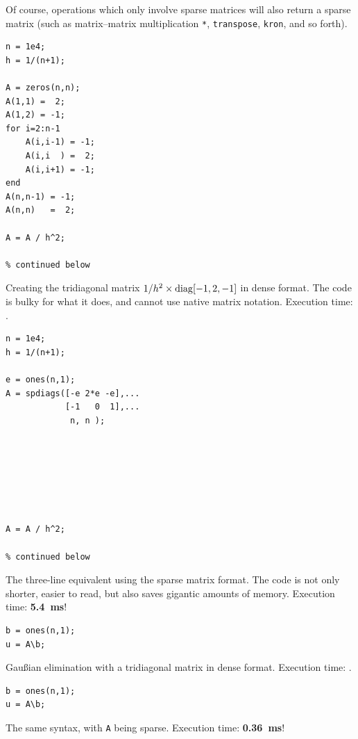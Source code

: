 
Of course, operations which only involve sparse matrices will also return a
sparse matrix (such as matrix--matrix multiplication \lstinline!*!,
\lstinline!transpose!, \lstinline!kron!, and so forth).



\hfill
\begin{minipage}[t]{.45\textwidth}
\begin{lstlisting}[framerule=2pt,rulecolor=\color{badred}]
n = 1e4;
h = 1/(n+1);

A = zeros(n,n);
A(1,1) =  2;
A(1,2) = -1;
for i=2:n-1
    A(i,i-1) = -1;
    A(i,i  ) =  2;
    A(i,i+1) = -1;
end
A(n,n-1) = -1;
A(n,n)   =  2;

A = A / h^2;

% continued below
\end{lstlisting}
Creating the tridiagonal matrix $1/h^2\times\operatorname{diag}[-1, 2, -1]$ in dense format.
The code is bulky for what it does, and cannot use native matrix notation.
Execution time: .
\end{minipage}
\hfill
\begin{minipage}[t]{.45\textwidth}
\begin{lstlisting}[framerule=2pt,rulecolor=\color{goodgreen}]
n = 1e4;
h = 1/(n+1);

e = ones(n,1);
A = spdiags([-e 2*e -e],...
            [-1   0  1],...
             n, n );







A = A / h^2;

% continued below
\end{lstlisting}
The three-line equivalent using the sparse matrix format. The code is not only
shorter, easier to read, but also saves gigantic amounts of memory. Execution
time: \textbf{\SI{5.4}{\milli\second}}!
\end{minipage}
\hfill

\medskip

\hfill
\begin{minipage}[t]{.45\textwidth}
\begin{lstlisting}[framerule=2pt,rulecolor=\color{badred}]
% A in dense format
b = ones(n,1);
u = A\b;
\end{lstlisting}
Gau{\ss}ian elimination with a tridiagonal matrix in dense format. Execution
time: .
\end{minipage}
\hfill
\begin{minipage}[t]{.45\textwidth}
\begin{lstlisting}[framerule=2pt,rulecolor=\color{goodgreen}]
% A in sparse format
b = ones(n,1);
u = A\b;
\end{lstlisting}
The same syntax, with \lstinline!A! being sparse. Execution time: \textbf{\SI{0.36}{\milli\second}}!
\end{minipage}
\hfill

